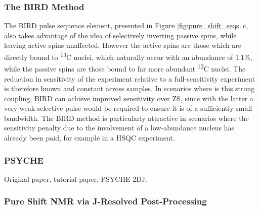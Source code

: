\subsubsection{The \acs{BIRD} Method}
The \ac{BIRD} pulse sequence element\cite{Garbow1982,Bax1983}, presented in
Figure \ref{fig:pure_shift_seqs}.c, also takes advantage of the idea of
selectively inverting passive spins, while leaving active spins unaffected.
However the active spins are those which are directly bound to
\textsuperscript{13}C nuclei, which naturally occur with an abundance of 1.1\%,
while the passive spins are those bound to far more abundant
\textsuperscript{12}C nuclei. The reduction in sensitivity of the experiment
relative to a full-sensitivity experiment is therefore known and constant
across samples. In scenarios where is this strong coupling, \ac{BIRD} can
achieve improved sensitivity over \ac{ZS}, since with the latter a very weak
selective pulse would be required to ensure it is of a sufficiently small
bandwidth. The \ac{BIRD} method is particularly attractive in scenarios where
the sensitivity penalty due to the involvement of a low-abundance nucleus has
already been paid, for example in a \ac{HSQC} experiment\cite{Paudel2013}.

\subsubsection{PSYCHE}
\label{subsec:psyche}
Original paper\cite{Foroozandeh2014}, tutorial paper\cite{Foroozandeh2018}, PSYCHE-2DJ\cite{Kiraly2017}.

\subsubsection{Pure Shift NMR via J-Resolved Post-Processing}

